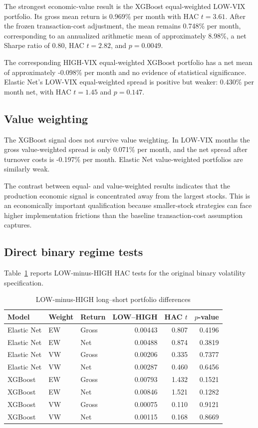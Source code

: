 The strongest economic-value result is the XGBoost equal-weighted LOW-VIX portfolio. Its gross mean return is 0.969\% per month with HAC $t=3.61$. After the frozen transaction-cost adjustment, the mean remains 0.748\% per month, corresponding to an annualized arithmetic mean of approximately 8.98\%, a net Sharpe ratio of 0.80, HAC $t=2.82$, and $p=0.0049$.

The corresponding HIGH-VIX equal-weighted XGBoost portfolio has a net mean of approximately -0.098\% per month and no evidence of statistical significance. Elastic Net's LOW-VIX equal-weighted spread is positive but weaker: 0.430\% per month net, with HAC $t=1.45$ and $p=0.147$.

\subsection{Value weighting}

The XGBoost signal does not survive value weighting. In LOW-VIX months the gross value-weighted spread is only 0.071\% per month, and the net spread after turnover costs is -0.197\% per month. Elastic Net value-weighted portfolios are similarly weak.

The contrast between equal- and value-weighted results indicates that the production economic signal is concentrated away from the largest stocks. This is an economically important qualification because smaller-stock strategies can face higher implementation frictions than the baseline transaction-cost assumption captures.

\subsection{Direct binary regime tests}

Table~\ref{tab:portfolio-regime-tests} reports LOW-minus-HIGH HAC tests for the original binary volatility specification.

\begin{table}[htbp]
\centering
\caption{LOW-minus-HIGH long--short portfolio differences}
\label{tab:portfolio-regime-tests}
\begin{tabular}{lllrrr}
\hline
Model & Weight & Return & LOW--HIGH & HAC $t$ & $p$-value \\
\hline
Elastic Net & EW & Gross & 0.00443 & 0.807 & 0.4196 \\
Elastic Net & EW & Net   & 0.00488 & 0.874 & 0.3819 \\
Elastic Net & VW & Gross & 0.00206 & 0.335 & 0.7377 \\
Elastic Net & VW & Net   & 0.00287 & 0.460 & 0.6456 \\
XGBoost     & EW & Gross & 0.00793 & 1.432 & 0.1521 \\
XGBoost     & EW & Net   & 0.00846 & 1.521 & 0.1282 \\
XGBoost     & VW & Gross & 0.00075 & 0.110 & 0.9121 \\
XGBoost     & VW & Net   & 0.00115 & 0.168 & 0.8669 \\
\hline
\end{tabular}
\end{table}


